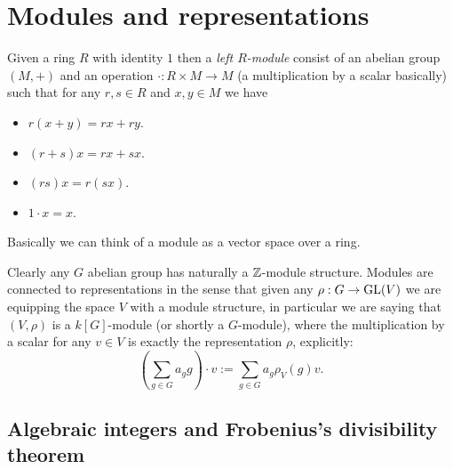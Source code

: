 \documentclass[11pt]{scrartcl}
\begin{document}
	
	
	\newpage
	
	\section{Modules and representations}
	
	\begin{definition}[Module]
		Given a ring $R$ with identity $1$ then a \textit{left $R$-module} consist of an abelian group $(M,+)$ and an operation $\cdot:R\times M\to M$ (a multiplication by a scalar basically) such that for any $r,s\in R$ and $x,y\in M$ we have
		\begin{itemize}
			\item $r(x+y)=rx+ry.$
			\item $(r+s)x=rx+sx.$
			\item $(rs)x=r(sx).$
			\item $1\cdot x = x.$
		\end{itemize} 
		Basically we can think of a module as a vector space over a ring.
	\end{definition}
	Clearly any $G$ abelian group has naturally a $\mathbb Z$-module structure. Modules are connected to representations in the sense that given any $\rho:G\to\operatorname{GL}(V)$ we are equipping the space $V$ with a module structure, in particular we are saying that $(V,\rho)$ is a $k[G]$-module (or shortly a $G$-module), where the multiplication by a scalar for any $v\in V$ is exactly the representation $\rho$, explicitly:
	$$\left(\sum_{g\in G} a_g g\right)\cdot v:=\sum_{g\in G}a_g\rho_V(g)v.$$
	
	\subsection{Algebraic integers and Frobenius's divisibility theorem}
	
\end{document}

